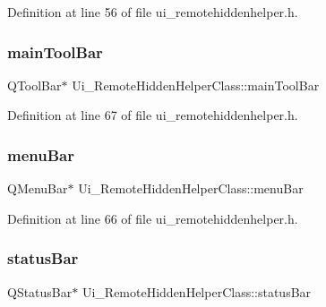Definition at line 56 of file ui\+\_\+remotehiddenhelper.\+h.

\hypertarget{class_ui___remote_hidden_helper_class_a2e835959e777a658b3b38ae3848b37de}{}\label{class_ui___remote_hidden_helper_class_a2e835959e777a658b3b38ae3848b37de} 
\subsubsection{\texorpdfstring{main\+Tool\+Bar}{mainToolBar}}
{\footnotesize\ttfamily Q\+Tool\+Bar$\ast$ Ui\+\_\+\+Remote\+Hidden\+Helper\+Class\+::main\+Tool\+Bar}



Definition at line 67 of file ui\+\_\+remotehiddenhelper.\+h.

\hypertarget{class_ui___remote_hidden_helper_class_a5070c6224e8c4c0de41bcf625ac9abf0}{}\label{class_ui___remote_hidden_helper_class_a5070c6224e8c4c0de41bcf625ac9abf0} 
\subsubsection{\texorpdfstring{menu\+Bar}{menuBar}}
{\footnotesize\ttfamily Q\+Menu\+Bar$\ast$ Ui\+\_\+\+Remote\+Hidden\+Helper\+Class\+::menu\+Bar}



Definition at line 66 of file ui\+\_\+remotehiddenhelper.\+h.

\hypertarget{class_ui___remote_hidden_helper_class_aec299b00778de7ae92f885205fbd2820}{}\label{class_ui___remote_hidden_helper_class_aec299b00778de7ae92f885205fbd2820} 
\subsubsection{\texorpdfstring{status\+Bar}{statusBar}}
{\footnotesize\ttfamily Q\+Status\+Bar$\ast$ Ui\+\_\+\+Remote\+Hidden\+Helper\+Class\+::status\+Bar}



